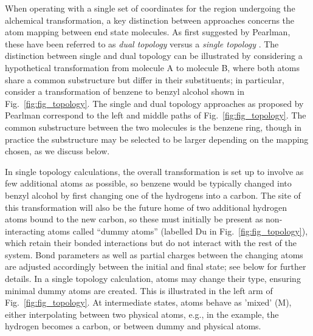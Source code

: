 \documentclass[9pt,bestpractices]{livecoms}
\newcommand{\sbnote}[1]{%
  {\bfseries{}[SB: }%
  {\textcolor{blue}{#1}}{\bfseries{}]}
  }
\begin{document}
When operating with a single set of coordinates for the region undergoing the alchemical transformation, a key distinction between approaches concerns the atom mapping between end state molecules. %
As first suggested by Pearlman, these have been referred to as \emph{dual topology} versus a \emph{single topology} \cite{Pearlman_1994}. The distinction between single and dual topology can be illustrated by considering a hypothetical transformation from molecule A to molecule B, where both atoms share a common substructure but differ in their substituents; in particular, consider a transformation of benzene to benzyl alcohol shown in Fig.~\ref{fig:fig_topology}. The single and dual topology approaches as proposed by Pearlman correspond to the left and middle paths of Fig.~\ref{fig:fig_topology}.  %
The common substructure between the two molecules is the benzene ring, though in practice the substructure may be selected to be larger depending on the mapping chosen, as we discuss below.

In single topology calculations, the overall transformation is set up to involve as few additional atoms as possible, so benzene would be typically changed into benzyl alcohol by first changing one of the hydrogens into a carbon. The site of this transformation will also be the future home of two additional hydrogen atoms bound to the new carbon, so these must initially be present as non-interacting atoms called ``dummy atoms'' (labelled Du in Fig.~\ref{fig:fig_topology}), which retain their bonded interactions but do not interact with the rest of the system.  Bond parameters as well as partial charges between the changing atoms are adjusted accordingly between the initial and final state; see below for further details. In a single topology calculation, atoms may change their type, ensuring minimal dummy atoms are created. This is illustrated in the left arm of Fig.~\ref{fig:fig_topology}. At intermediate states, atoms behave as 'mixed' (M), either interpolating between two physical atoms, e.g., in the example, the hydrogen becomes a carbon, or between dummy and physical atoms.
\end{document}
